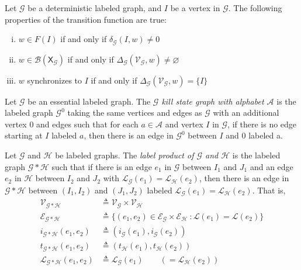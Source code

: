\documentclass[hidelinks]{article}
\newcommand{\Ac}{\mathcal{A}}  %
\newcommand{\Lc}{\mathcal{L}}  %
\newcommand{\Gc}{\mathcal{G}}  %
\newcommand{\Hc}{\mathcal{H}}  %
\newcommand{\Vc}{\mathcal{V}}
\newcommand{\Ec}{\mathcal{E}}
\newcommand{\Bc}{\mathcal{B}}
\newcommand{\shift}[1]{\mathsf{X}_{#1}}
\newcommand{\term}[1]{\textit{#1}}
\theoremstyle{definition}
\begin{document}
\begin{theorem}
    Let \(\Gc\) be a deterministic labeled graph, and \(I\) be a vertex in \(\Gc\). The following properties of the 
    transition function are true:

    \begin{enumerate}[(i)]
        \item \(w \in F(I)\) if and only if \(\delta_\Gc(I, w) \neq 0\)
        \item \(w \in \Bc(\shift\Gc)\) if and only if \(\Delta_\Gc(\Vc_\Gc, w) \neq \varnothing\)
        \item \(w\) synchronizes to \(I\) if and only if \(\Delta_\Gc(\Vc_\Gc, w) = \{I\}\)
    \end{enumerate}
\end{theorem}

\begin{definition}
    Let \(\Gc\) be an essential labeled graph. The \term{\(\Gc\) kill state graph with alphabet \(\Ac\)}
    is the labeled graph \(\Gc^0\) taking the same vertices and edges as \(\Gc\) with 
    an additional vertex \(0\) and edges such that for each \(a \in \Ac\) and vertex \(I\) in \(\Gc\),
    if there is no edge starting at \(I\) labeled \(a\), then there is an edge in \(\Gc^0\) 
    between \(I\) and \(0\) labeled a.
\end{definition}

\begin{definition}
    Let \(\Gc\) and \(\Hc\) be labeled graphs. The \term{label product of \(\Gc\) and \(\Hc\)}
    is the labeled graph \(\Gc * \Hc\) such that if there is an edge \(e_1\) in \(\Gc\)
    between \(I_1\) and \(J_1\) and an edge \(e_2\) in \(\Hc\) between \(I_2\) and \(J_2\)
    with \(\Lc_\Gc(e_1) = \Lc_\Hc(e_2)\), then there is an edge in \(\Gc * \Hc\) between 
    \((I_1, I_2)\) and \((J_1, J_2)\) labeled \(\Lc_\Gc(e_1) = \Lc_\Hc(e_2)\). That is, 
    \begin{align*}
        \Vc_{\Gc * \Hc} &\triangleq \Vc_\Gc \times \Vc_\Hc \\ 
        \Ec_{\Gc * \Hc} &\triangleq \{ (e_1, e_2) \in \Ec_\Gc \times \Ec_\Hc\ : \Lc(e_1) = \Lc(e_2)\} \\ 
        i_{\Gc * \Hc}(e_1, e_2) &\triangleq (i_\Gc(e_1), i_\Gc(e_2)) \\ 
        t_{\Gc * \Hc}(e_1, e_2) &\triangleq (t_\Hc(e_1), t_\Hc(e_2)) \\ 
        \Lc_{\Gc * \Hc}(e_1, e_2) &\triangleq \Lc_\Gc(e_1) \qquad ( = \Lc_\Hc(e_2) )
    \end{align*}
\end{definition}
\end{document}
